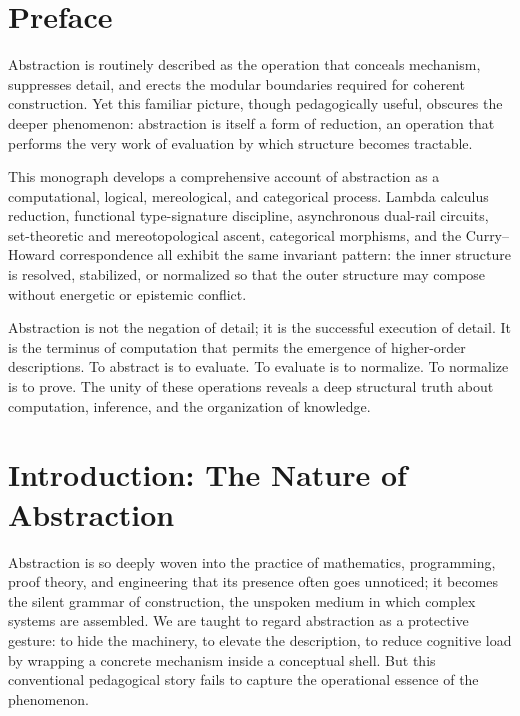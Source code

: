 \documentclass[11pt,letterpaper]{article}
\begin{document}
\newpage

\tableofcontents
\newpage

\section{Preface}

Abstraction is routinely described as the operation that conceals mechanism, suppresses detail, and erects the modular boundaries required for coherent construction. Yet this familiar picture, though pedagogically useful, obscures the deeper phenomenon: abstraction is itself a form of reduction, an operation that performs the very work of evaluation by which structure becomes tractable.

This monograph develops a comprehensive account of abstraction as a computational, logical, mereological, and categorical process. Lambda calculus reduction, functional type-signature discipline, asynchronous dual-rail circuits, set-theoretic and mereotopological ascent, categorical morphisms, and the Curry--Howard correspondence all exhibit the same invariant pattern: the inner structure is resolved, stabilized, or normalized so that the outer structure may compose without energetic or epistemic conflict. 

Abstraction is not the negation of detail; it is the successful execution of detail. It is the terminus of computation that permits the emergence of higher-order descriptions. To abstract is to evaluate. To evaluate is to normalize. To normalize is to prove. The unity of these operations reveals a deep structural truth about computation, inference, and the organization of knowledge.

\section{Introduction: The Nature of Abstraction}

Abstraction is so deeply woven into the practice of mathematics, programming, proof theory, and engineering that its presence often goes unnoticed; it becomes the silent grammar of construction, the unspoken medium in which complex systems are assembled. We are taught to regard abstraction as a protective gesture: to hide the machinery, to elevate the description, to reduce cognitive load by wrapping a concrete mechanism inside a conceptual shell. But this conventional pedagogical story fails to capture the operational essence of the phenomenon.
\end{document}
